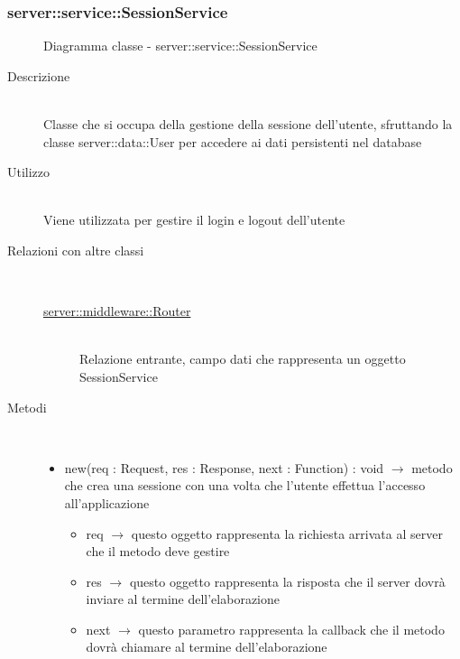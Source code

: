 \subsubsection[SessionService]{server::service::SessionService}
\begin{figure}[H]
	\centering
	\caption{Diagramma classe - server::service::SessionService}
\end{figure}\begin{description}
\item[Descrizione] \hfill \\
Classe che si occupa della gestione della sessione dell'utente, sfruttando la classe server::data::User per accedere ai dati persistenti nel database
\item[Utilizzo] \hfill \\
Viene utilizzata per gestire il login e logout dell'utente
\item[Relazioni con altre classi] \hfill \\
\vspace{-7mm}
\begin{description}
	\item[\hyperlink{server::middleware::Router}{server::middleware::Router}] \hfill \\
	Relazione entrante, campo dati che rappresenta un oggetto SessionService
\end{description}

\item[Metodi] \hfill \\
\vspace{-7mm}
\begin{itemize}
	\item new(req : Request, res : Response, next : Function) : void $\rightarrow$ metodo che crea una sessione con una volta che l'utente effettua l'accesso all'applicazione\begin{itemize}
		\item req $\rightarrow$ questo oggetto rappresenta la richiesta arrivata al server che il metodo deve gestire
		\item res $\rightarrow$ questo oggetto rappresenta la risposta che il server dovrà inviare al termine dell'elaborazione
		\item next $\rightarrow$ questo parametro rappresenta la callback che il metodo dovrà chiamare al termine dell’elaborazione
	\end{itemize}
	

\end{itemize}
\end{description}

